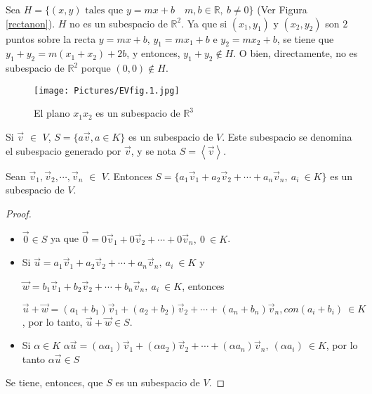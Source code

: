 \bigskip

\begin{example}
\label{rectanonueva}
Sea $H=\{(x,y) \text{ tales que } y=mx+b \quad m, b \in \mathbb{R}, ~ b \neq 0 \}$ 
(Ver Figura \ref{rectanon}).
$H$ no es un subespacio de $\mathbb{R}^2$. Ya que si $(x_1,y_1)$ y $(x_2,y_2)$  son $2$ puntos sobre la recta $y=mx+b$, $y_1=m x_1+ b$ e $y_2=m x_2+ b$, se tiene que  $y_1+y_2= m(x_1+x_2) + 2 b$,  y entonces, $y_1+y_2  \notin H$.
O bien, directamente,  no es subespacio de $\mathbb{R}^2$ porque $(0,0) \notin H$.
\end{example}
\begin{figure}
    \centering
    \texttt{[image: Pictures/EVfig.1.jpg]}
    \caption{El plano $x_1x_2$ es un subespacio de $\mathbb{R}^3$ }
    \label{EVfig.1}
\end{figure}
\begin{example}
Si $\vec{v}$  $ \in$ $V$, $S=\{a\vec{v}, a\in K \}$ es un subespacio de $V$. Este subespacio se denomina el subespacio generado por $\vec{v}$, y se nota $S=\left\langle \vec{v}\right\rangle$.
\label{ejgenv}
\end{example}

\bigskip
\begin{theorem}
\label{PROP121}
Sean $\vec{v}_1,\vec{v}_2,\cdots,\vec{v}_n$ $ \in$ $V$. Entonces $S=\{a_1 \vec{v}_1+a_2 \vec{v}_2+\cdots +a_n\vec{v}_n, ~ a_i ~ \in K \}$ es un subespacio de $V$. 
\noindent
\begin{proof}

\begin{itemize}
\item
$\vec{0}\in S$ ya que 
$\vec{0} =0 \vec{v}_1+0 \vec{v}_2+\cdots +0\vec{v}_n, ~ 0 ~ \in K $.

\item
Si
 $\vec{u} =a_1 \vec{v}_1+a_2 \vec{v}_2+\cdots +a_n\vec{v}_n, ~ a_i ~ \in K$ y
 
 $\vec{w} =b_1 \vec{v}_1+b_2 \vec{v}_2+\cdots +b_n\vec{v}_n, ~ a_i ~ \in K $,
 entonces
 
 $\vec{u}+\vec{w} =(a_1+b_1) \vec{v}_1+(a_2+b_2) \vec{v}_2+\cdots +(a_n+b_n)\vec{v}_n, 
 
 con (a_i+b_i) ~ \in K $, por lo tanto, $  \vec{u}+\vec{w} \in S$.
 \item
 Si $\alpha \in K$
 $ \alpha \vec{u} = (\alpha a_1) \vec{v}_1+  (\alpha a_2) \vec{v}_2+\cdots + (\alpha a_n)\vec{v}_n, ~ (\alpha a_i) ~ \in K $, por lo tanto $  \alpha \vec{u}  \in S$
 \end{itemize}
 Se tiene, entonces, que $S$ es un subespacio de $V$.
 \end{proof}
\end{theorem}





